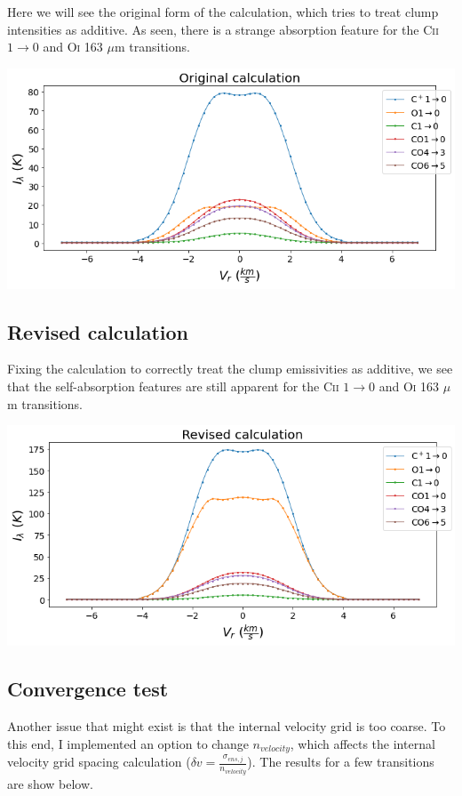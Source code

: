 \documentclass[a4paper]{article}
\begin{document}
    Here we will see the original form of the calculation, which tries to treat clump intensities as additive. As seen, there is a strange absorption feature for the C\textsc{ii} \(1 \rightarrow 0\) and O\textsc{i} 163 \(\mu\)m transitions.

    \includegraphics*[width=\linewidth]{voxel_single-clump_fv_new.png}

    \subsection{Revised calculation}

    Fixing the calculation to correctly treat the clump emissivities as additive, we see that the self-absorption features are still apparent for the C\textsc{ii} \(1 \rightarrow 0\) and O\textsc{i} 163 \(\mu\)m transitions.

    \includegraphics*[width=\linewidth]{voxel_single-clump_fv-calc_new.png}

    \subsection{Convergence test}

    Another issue that might exist is that the internal velocity grid is too coarse. To this end, I implemented an option to change \(n_{velocity}\), which affects the internal velocity grid spacing calculation (\(\delta v = \frac{\sigma_{ens,j}}{n_{velocity}}\)). The results for a few transitions are show below.
\end{document}

